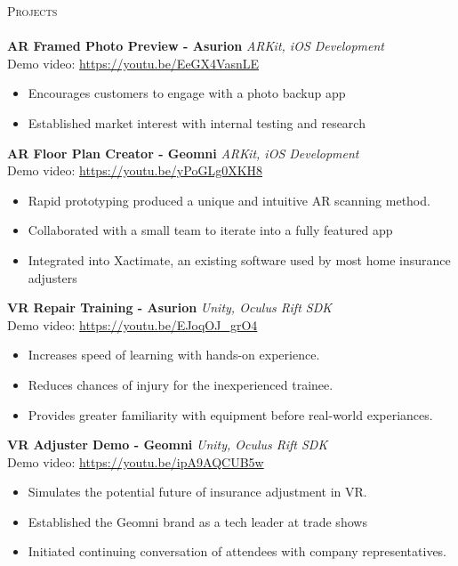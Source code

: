 \documentclass[a4paper]{article}
\newcommand{\lineunder} {
    \vspace*{-8pt} \\
    \hspace*{-18pt} \hrulefill \\
}
\newcommand{\header} [1] {
    {\hspace*{-18pt}\vspace*{6pt} \textsc{#1}}
    \vspace*{-6pt} \lineunder
}
\begin{document}
\header{Projects}
{\textbf{AR Framed Photo Preview - Asurion}} \hfill {\sl ARKit, iOS Development} \\
Demo video: \href{https://youtu.be/EeGX4VasnLE}{https://youtu.be/EeGX4VasnLE}
\vspace{-3mm}
\begin{itemize} \itemsep 1pt
	\item Encourages customers to engage with a photo backup app
	\item Established market interest with internal testing and research
\end{itemize}

{\textbf{AR Floor Plan Creator - Geomni}} \hfill {\sl ARKit, iOS Development} \\
Demo video: \href{https://youtu.be/yPoGLg0XKH8}{https://youtu.be/yPoGLg0XKH8}
\vspace{-3mm}
\begin{itemize} \itemsep 1pt
	\item Rapid prototyping produced a unique and intuitive AR scanning method.
	\item Collaborated with a small team to iterate into a fully featured app
	\item Integrated into Xactimate, an existing software used by most home insurance adjusters
\end{itemize}

{\textbf{VR Repair Training - Asurion}} \hfill {\sl Unity, Oculus Rift SDK} \\
Demo video: \href{https://youtu.be/EJoqOJ_grO4}{https://youtu.be/EJoqOJ\_grO4}
\vspace{-3mm}
\begin{itemize} \itemsep 1pt
	\item Increases speed of learning with hands-on experience.
	\item Reduces chances of injury for the inexperienced trainee.
	\item Provides greater familiarity with equipment before real-world experiances.
\end{itemize}

{\textbf{VR Adjuster Demo - Geomni}} \hfill {\sl Unity, Oculus Rift SDK} \\
Demo video: \href{https://youtu.be/ipA9AQCUB5w}{https://youtu.be/ipA9AQCUB5w}
\vspace{-3mm}
\begin{itemize} \itemsep 1pt
	\item Simulates the potential future of insurance adjustment in VR.
	\item Established the Geomni brand as a tech leader at trade shows
	\item Initiated continuing conversation of attendees with company representatives.
\end{itemize}
\end{document}
